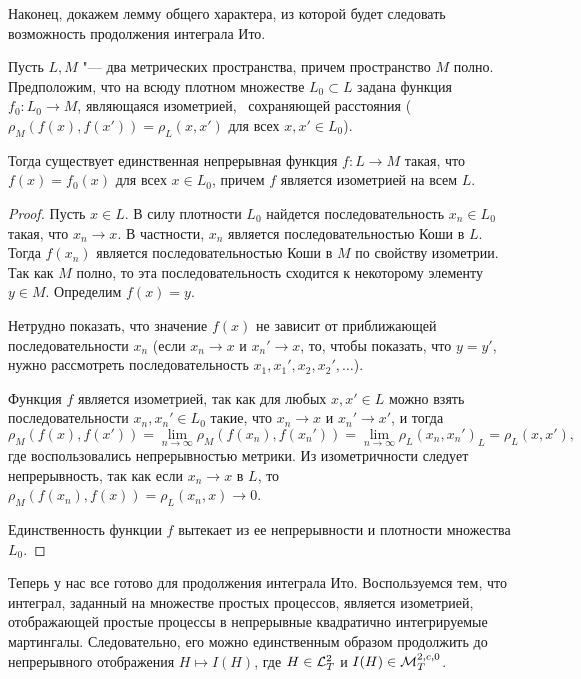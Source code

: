 Наконец, докажем лемму общего характера, из которой будет следовать возможность продолжения интеграла Ито.

\begin{lemma}[об изометрии]
Пусть $L,M$ "--- два метрических пространства, причем пространство $M$ полно.
Предположим, что на всюду плотном множестве $L_0\subset L$ задана функция $f_0\colon L_0\to M$, являющаяся изометрией, \te\ сохраняющей расстояния ($\rho_M(f(x),f(x')) = \rho_L(x,x')$ для всех $x,x'\in L_0$). 

Тогда существует единственная непрерывная функция $f\colon L\to M$ такая, что $f(x) = f_0(x)$ для всех $x\in L_0$, причем $f$ является изометрией на всем $L$.
\end{lemma}

\begin{proof}
Пусть $x\in L$.
В силу плотности $L_0$ найдется последовательность $x_n\in L_0$ такая, что $x_n\to x$.
В частности, $x_n$ является последовательностью Коши в $L$.
Тогда $f(x_n)$ является последовательностью Коши в $M$ по свойству изометрии.
Так как $M$ полно, то эта последовательность сходится к некоторому элементу $y\in M$.
Определим $f(x) = y$.

Нетрудно показать, что значение $f(x)$ не зависит от приближающей последовательности $x_n$ (если $x_n\to x$ и $x_n'\to x$, то, чтобы показать, что $y=y'$, нужно рассмотреть последовательность $x_1,x_1',x_2,x_2',\ldots$).

Функция $f$ является изометрией, так как для любых $x,x'\in L$ можно взять последовательности $x_n,x_n'\in L_0$ такие, что $x_n\to x$ и $x_n'\to x'$, и тогда
\[
\rho_M(f(x), f(x')) = \lim\limits_{n\to\infty} \rho_M(f(x_n),f(x_n')) = \lim\limits_{n\to\infty} \rho_L(x_n, x_n')_L= \rho_L(x,x'),
\]
где воспользовались непрерывностью метрики.
Из изометричности следует непрерывность, так как если $x_n\to x$ в $L$, то $\rho_M(f(x_n), f(x)) = \rho_L(x_n,x) \to 0$.

Единственность функции $f$ вытекает из ее непрерывности и плотности множества $L_0$.
\end{proof}

Теперь у нас все готово для продолжения интеграла Ито. 
Воспользуемся тем, что интеграл, заданный на множестве простых процессов, является изометрией, отображающей простые процессы в непрерывные квадратично интегрируемые мартингалы.
Следовательно, его можно единственным образом продолжить до непрерывного отображения $H\mapsto I(H)$, где $H\in \mathcal{L}^2_T$ и $I(H)\in \mathcal{M}_T^{2,c,0}$.

